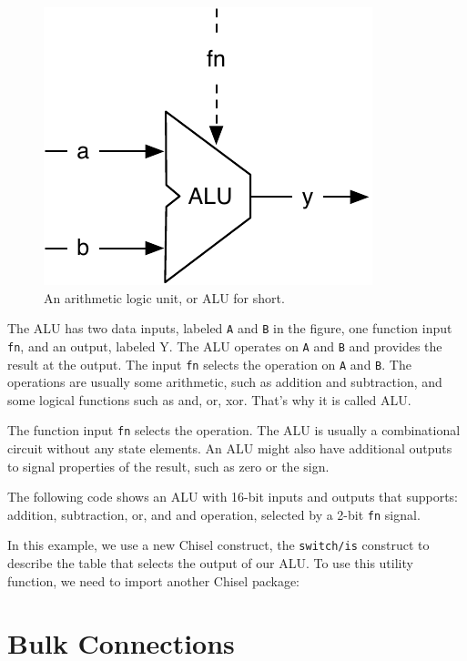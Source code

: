 \documentclass[%
    10pt,
    headinclude, footexclude,
    openright, %
    notitlepage,
    cleardoubleempty,
    headsepline,
    pointlessnumbers,
    bibtotoc, idxtotoc,
    ]{scrbook}
\newcommand{\code}[1]{{\small{\texttt{#1}}}}
\newcommand{\scale}{0.7}
\begin{document}
\begin{figure}
  \centering
  \includegraphics[scale=\scale]{figures/alu}
  \caption{An arithmetic logic unit, or ALU for short.}
  \label{fig:alu}
\end{figure}

The ALU has two data inputs, labeled \code{A} and \code{B} in the figure, one function input \code{fn},
and an output, labeled {Y}. The ALU operates on \code{A} and \code{B} and provides the result
at the output. The input \code{fn} selects the operation on \code{A} and \code{B}.
The operations are usually some arithmetic, such as addition and subtraction, and some logical
functions such as and, or, xor. That's why it is called ALU.

The function input \code{fn} selects the operation. The ALU is usually a combinational
circuit without any state elements. An ALU might also have additional outputs to signal properties
of the result, such as zero or the sign.

The following code shows an ALU with 16-bit inputs and outputs that supports: addition, subtraction, or, and and
operation, selected by a 2-bit \code{fn} signal.


\noindent In this example, we use a new Chisel construct, the \code{switch/is} construct to describe
the table that selects the output of our ALU.
To use this utility function, we need to import another Chisel package:


\section{Bulk Connections}
\end{document}
